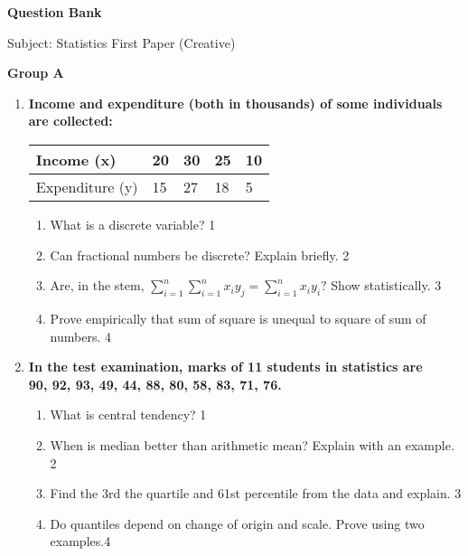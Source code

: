 \documentclass{article}
\begin{document}
\begin{center}
  \bfseries\large
Question Bank

\normalsize

  Subject: Statistics First Paper (Creative)

\end{center}

\begin{center}
\textbf{Group A}
\end{center}

\begin{enumerate}
  \item
  \textbf{Income and expenditure (both in thousands) of some individuals are collected:}
 

\begin{table}[h]
 \begin{center}
\begin{tabular}{l|l|l|l|l}

Income (x)  & 20 & 30 & 25 & 10 \\ \hline
Expenditure (y) & 15  & 27  & 18 & 5 \\ 
\end{tabular}
\end{center}
\end{table}


  \begin{enumerate}
    \item
	What is a discrete variable? \hfill 1
    \item
    	Can fractional numbers be discrete? Explain briefly.  \hfill 2
    \item
    	Are, in the stem, $\displaystyle \sum_{i=1}^{n} \sum_{i=1}^{n} x_iy_j = \sum_{i=1}^{n} x_iy_i?$ Show statistically. \hfill 3
     \item
     	Prove empirically that sum of square is unequal to square of sum of numbers. \hfill 4
  \end{enumerate}
  
    \item
  \textbf{In the test examination, marks of 11 students in statistics are \\ 90, 92, 93, 49, 44, 88, 80, 58, 83, 71, 76.}
  \begin{enumerate}
    \item
	What is central tendency? \hfill 1
    \item
	When is median better than arithmetic mean? Explain with an example. \hfill 2
    \item  
	Find the 3rd the quartile and 61st percentile from the data and explain.  \hfill 3
    \item
	Do quantiles depend on change of origin and scale. Prove using two examples.\hfill 4
\end{enumerate}



\end{enumerate}
\end{document}
